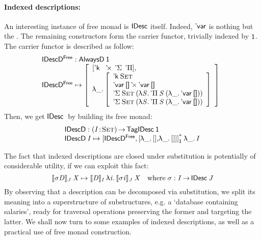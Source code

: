 \paragraph{Indexed descriptions:}

An interesting instance of free monad is $\SYMBIDesc$ itself. Indeed,
$\SYMBDVar$ is nothing but the \return. The remaining constructors form
the carrier functor, trivially indexed by $\Unit$. The carrier functor
is described as follow:
%
\[\stk{
\IDescFreeD : \ATagIDesc{\Unit} \\
\begin{array}{@{}ll}
\IDescFreeD \mapsto \bigRedBracket{\begin{array}{l}
                                \sqr{\SYMBDConst\:\:
                                     \DProd\:\:
                                     \SYMBDSigma\:\:
                                     \SYMBDPi} \red{,}\\
                                  \LAM{\_}\bigRedBracket{\begin{array}{l}
                                        \DConst{\Set}               \\
                                        \DProd{\DVar{\Void}}{\DVar{\Void}}  \\
                                        \DSigma{\Set}{(\LAM{\V{S}} \DPi{\V{S}}{(\LAM{\_} \DVar{\Void})})} \\
                                        \DSigma{\Set}{(\LAM{\V{S}} \DPi{\V{S}}{(\LAM{\_} \DVar{\Void})})}
                                    \end{array}}\end{array}}
\end{array}
}\]
%
Then, we get $\IDesc$ by building its free monad:
%
\[\stk{
\IDescD : \PI{\V{I}}{\Set} \TagIDesc{\Unit} \\
\IDescD\: \V{I} \mapsto \FreeIMonad{\red{[}\IDescFreeD\red{,[}\LAM{\_}\sqr{}\red{,}\LAM{\_}\red{[]]]}}{\Unit}\LAM{\_}\V{I}
}\]

The fact that indexed descriptions are closed under substitution
is potentially of considerable utility, if we can exploit this fact:
\[
\idescop{\V{\sigma} \V{D}}{\V{J}}{\V{X}} 
    \mapsto 
        \idescop{\V{D}}
                {\V{I}}
                {\LAM{\V{i}}
                     {\idescop{\V{\sigma} \V{i}}
                              {\V{J}}
                              {\V{X}}}}
        \quad \mbox{where}\;\V{\sigma}:\V{I}\To\IDesc{\V{J}}
\]
By observing that a description can be decomposed via substitution, we
split its meaning into a superstructure of substructures, e.g. a
`database containing salaries', ready for traversal operations
preserving the former and targeting the latter. We shall now turn to
some examples of indexed descriptions, as well as a practical use of
free monad construction.
 
